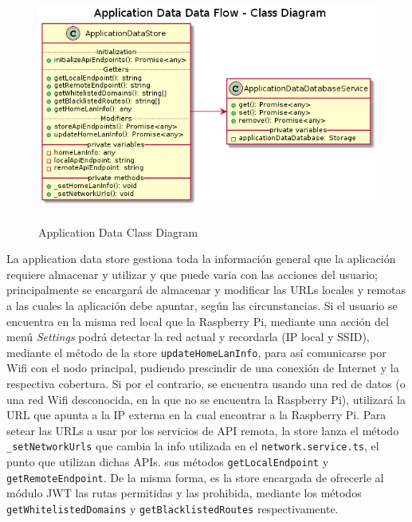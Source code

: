 \begin{figure}[hbt!]
\centering
\includegraphics[height=3in]{figures/diagrams/front/data-flow/app-data.png}
\caption[app-data]{Application Data Class Diagram\footnotemark}
\end{figure}

La application data store gestiona toda la información general que la aplicación requiere almacenar y utilizar y que puede varia con las acciones del usuario; principalmente se encargará de almacenar y modificar las URLs locales y remotas a las cuales la aplicación debe apuntar, según las circunstancias.
Si el usuario se encuentra en la misma red local que la Raspberry Pi, mediante una acción del menú \textit{Settings} podrá detectar la red actual y recordarla (IP local y SSID), mediante el método de la store \verb|updateHomeLanInfo|, para así comunicarse por Wifi con el nodo principal, pudiendo prescindir de una conexión de Internet y la respectiva cobertura. Si por el contrario, se encuentra usando una red de datos (o una red Wifi desconocida, en la que no se encuentra la Raspberry Pi), utilizará la URL que apunta a la IP externa en la cual encontrar a la Raspberry Pi. Para setear las URLs a usar por los servicios de API remota, la store lanza el método \verb|_setNetworkUrls| que cambia la info utilizada en el \verb|network.service.ts|, el punto que utilizan dichas APIs. sus métodos \verb|getLocalEndpoint| y \verb|getRemoteEndpoint|.
De la misma forma, es la store encargada de ofrecerle al módulo JWT las rutas permitidas y las prohibida, mediante los métodos \verb|getWhitelistedDomains| y \verb|getBlacklistedRoutes| respectivamente.

